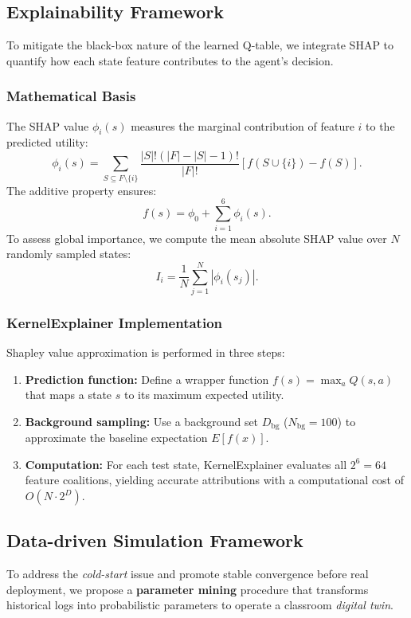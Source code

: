 \documentclass[conference]{IEEEtran}
\begin{document}
\subsection{Explainability Framework}
To mitigate the black-box nature of the learned Q-table, we integrate SHAP \cite{lundberg2017unified} to quantify how each state feature contributes to the agent’s decision.

\subsubsection{Mathematical Basis}
The SHAP value $\phi_i(s)$ measures the marginal contribution of feature $i$ to the predicted utility:
\begin{equation}
\phi_i(s) = \sum_{S \subseteq F \setminus \{i\}} 
\frac{|S|!(|F|-|S|-1)!}{|F|!}
\left[f(S \cup \{i\}) - f(S)\right].
\end{equation}
The additive property ensures:
\begin{equation}
f(s) = \phi_0 + \sum_{i=1}^{6} \phi_i(s).
\end{equation}
To assess global importance, we compute the mean absolute SHAP value over $N$ randomly sampled states:
\begin{equation}
I_i = \frac{1}{N}\sum_{j=1}^{N}|\phi_i(s_j)|.
\end{equation}

\subsubsection{KernelExplainer Implementation}
Shapley value approximation is performed in three steps:
\begin{enumerate}
    \item \textbf{Prediction function:} Define a wrapper function $f(s) = \max_{a} Q(s,a)$ that maps a state $s$ to its maximum expected utility.
    \item \textbf{Background sampling:} Use a background set $D_{\text{bg}}$ ($N_{\text{bg}}=100$) to approximate the baseline expectation $E[f(x)]$.
    \item \textbf{Computation:} For each test state, KernelExplainer evaluates all $2^6=64$ feature coalitions, yielding accurate attributions with a computational cost of $O(N \cdot 2^D)$.
\end{enumerate}

\subsection{Data-driven Simulation Framework}
To address the \textit{cold-start} issue and promote stable convergence before real deployment, we propose a \textbf{parameter mining} procedure that transforms historical logs into probabilistic parameters to operate a classroom \textit{digital twin}.
\end{document}
